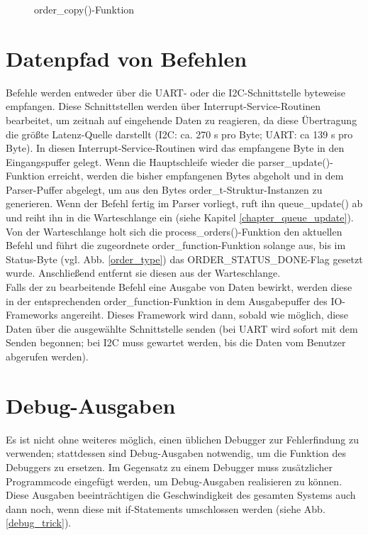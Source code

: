 \begin{figure}[htb]
 \centering
 \caption{\label{order_copy}order\_copy()-Funktion}
\end{figure}

\section{Datenpfad von Befehlen}
Befehle werden entweder über die UART- oder die I2C-Schnittstelle byteweise empfangen. Diese Schnittstellen werden über
Interrupt-Service-Routinen bearbeitet, um zeitnah auf eingehende Daten zu reagieren, da diese Übertragung die größte
Latenz-Quelle darstellt (I2C: ca. 270 \textmu{}s pro Byte; UART: ca 139 \textmu{}s pro Byte). In diesen Interrupt-Service-Routinen wird
das empfangene Byte in den Eingangspuffer gelegt. Wenn die Hauptschleife wieder die parser\_\-update()-Funktion erreicht,
werden die bisher empfangenen Bytes abgeholt und in dem Parser-Puffer abgelegt, um aus den Bytes order\_t-Struktur-Instanzen
zu generieren. Wenn der Befehl fertig im Parser vorliegt, ruft ihn queue\_\-update() ab und reiht ihn in die Warteschlange
ein (siehe Kapitel \ref{chapter_queue_update}). Von der Warteschlange holt sich die process\_\-orders()-Funktion den
aktuellen Befehl und führt die zugeordnete order\_function-Funktion solange aus, bis im Status-Byte (vgl. Abb. \ref{order_type})
das ORDER\_\-STATUS\_\-DONE-Flag gesetzt wurde. Anschließend entfernt sie diesen aus der Warteschlange.\\
Falls der zu bearbeitende Befehl eine Ausgabe von Daten bewirkt, werden diese in der entsprechenden order\_\-function-Funktion
in dem Ausgabepuffer des IO-Frameworks angereiht. Dieses Framework wird dann, sobald wie möglich, diese Daten
über die ausgewählte Schnittstelle senden (bei UART wird sofort mit dem Senden begonnen; bei I2C muss gewartet werden, bis die Daten
vom Benutzer abgerufen werden).

\section{Debug-Ausgaben \label{impl_debug}}
Es ist nicht ohne weiteres möglich, einen üblichen Debugger zur Fehlerfindung zu verwenden; stattdessen
sind Debug-Ausgaben notwendig, um die Funktion des Debuggers zu ersetzen.
Im Gegensatz zu einem Debugger muss zusätzlicher Programmcode eingefügt werden, um Debug-Ausgaben
realisieren zu können.
Diese Ausgaben beeinträchtigen die Geschwindigkeit des gesamten Systems auch dann noch, wenn
diese mit if-Statements umschlossen werden (siehe Abb. \ref{debug_trick}).

